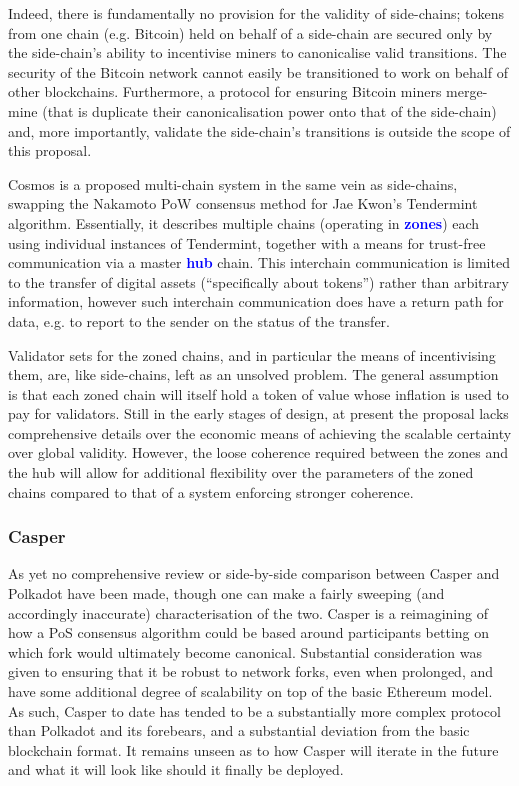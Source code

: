 \documentclass[t,usepdftitle=false]{beamer}
\makeatletter
\newcommand*\eg{e.g.\@\xspace}
\renewcommand{\textit}[1]{\textcolor{blue}{\textbf{#1}}}
\makeatother
\begin{document}
\begin{frame}
Indeed, there is fundamentally no provision for the validity of side-chains; tokens from one chain (\eg Bitcoin) held on behalf of a side-chain are secured only by the side-chain's ability to incentivise miners to canonicalise valid transitions. The security of the Bitcoin network cannot easily be transitioned to work on behalf of other blockchains. Furthermore, a protocol for ensuring Bitcoin miners merge-mine (that is duplicate their canonicalisation power onto that of the side-chain) and, more importantly, validate the side-chain's transitions is outside the scope of this proposal.

Cosmos \cite{kwon2016cosmos} is a proposed multi-chain system in the same vein as side-chains, swapping the Nakamoto PoW consensus method for Jae Kwon's Tendermint algorithm. Essentially, it describes multiple chains (operating in \textit{zones}) each using individual instances of Tendermint, together with a means for trust-free communication via a master \textit{hub} chain. This interchain communication is limited to the transfer of digital assets (``specifically about tokens'') rather than arbitrary information, however such interchain communication does have a return path for data, e.g. to report to the sender on the status of the transfer.

Validator sets for the zoned chains, and in particular the means of incentivising them, are, like side-chains, left as an unsolved problem. The general assumption is that each zoned chain will itself hold a token of value whose inflation is used to pay for validators. Still in the early stages of design, at present the proposal lacks comprehensive details over the economic means of achieving the scalable certainty over global validity. However, the loose coherence required between the zones and the hub will allow for additional flexibility over the parameters of the zoned chains compared to that of a system enforcing stronger coherence.

\subsubsection{Casper}\label{casper}

As yet no comprehensive review or side-by-side comparison between Casper \cite{buterin2016mauve} and Polkadot have been made, though one can make a fairly sweeping (and accordingly inaccurate) characterisation of the two. Casper is a reimagining of how a PoS consensus algorithm could be based around participants betting on which fork would ultimately become canonical. Substantial consideration was given to ensuring that it be robust to network forks, even when prolonged, and have some additional degree of scalability on top of the basic Ethereum model. As such, Casper to date has tended to be a substantially more complex protocol than Polkadot and its forebears, and a substantial deviation from the basic blockchain format. It remains unseen as to how Casper will iterate in the future and what it will look like should it finally be deployed.


\end{frame}
\end{document}
